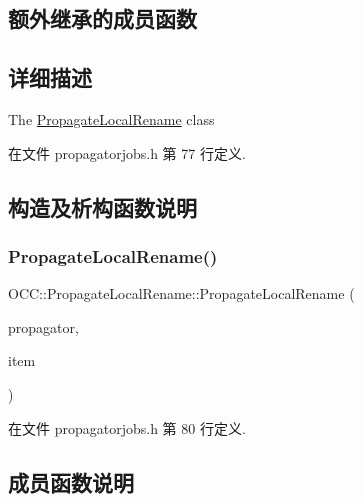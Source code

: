 \subsection*{额外继承的成员函数}


\subsection{详细描述}
The \hyperlink{class_o_c_c_1_1_propagate_local_rename}{Propagate\+Local\+Rename} class 

在文件 propagatorjobs.\+h 第 77 行定义.



\subsection{构造及析构函数说明}
\mbox{\label{class_o_c_c_1_1_propagate_local_rename_a51826759dd66859c29467e9af41643f0}} 
\subsubsection{\texorpdfstring{Propagate\+Local\+Rename()}{PropagateLocalRename()}}
{\footnotesize\ttfamily O\+C\+C\+::\+Propagate\+Local\+Rename\+::\+Propagate\+Local\+Rename (\begin{DoxyParamCaption}\item[{\hyperlink{class_o_c_c_1_1_owncloud_propagator}{Owncloud\+Propagator} $\ast$}]{propagator,  }\item[{const \hyperlink{namespace_o_c_c_acb6b0db82893659fbd0c98d3c5b8e2b8}{Sync\+File\+Item\+Ptr} \&}]{item }\end{DoxyParamCaption})}



在文件 propagatorjobs.\+h 第 80 行定义.



\subsection{成员函数说明}
\mbox{\label{class_o_c_c_1_1_propagate_local_rename_adfcdea813d4f88fc5f02d9f20f18d477}} 
